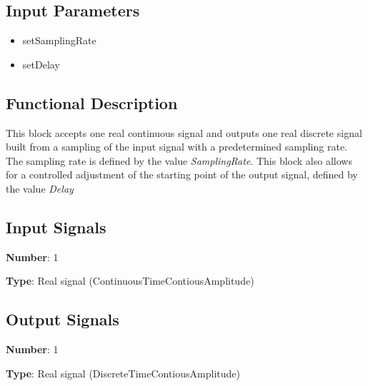 \documentclass[../../sdf/tex/BPSK_system.tex]{subfiles}
\date{ }
\begin{document}
\onlyinsubfile{\maketitle}

\subsection*{Input Parameters}

\begin{multicols}{2}
	\begin{itemize}
		\item setSamplingRate
		\item setDelay
	\end{itemize}
\end{multicols}

\subsection*{Functional Description}

This block accepts one real continuous signal and outputs one real discrete signal built from a sampling of the input signal with a predetermined sampling rate. The sampling rate is defined by the value \textit{SamplingRate}. This block also allows for a controlled adjustment of the starting point of the output signal, defined by the value \textit{Delay}

\subsection*{Input Signals}

\textbf{Number}: 1

\textbf{Type}: Real signal (ContinuousTimeContiousAmplitude)

\subsection*{Output Signals}

\textbf{Number}: 1

\textbf{Type}: Real signal (DiscreteTimeContiousAmplitude)
\end{document}
